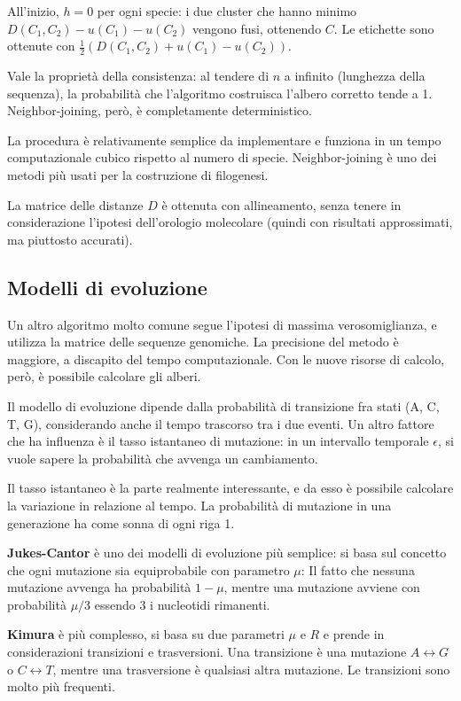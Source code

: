 All'inizio, $h = 0$ per ogni specie: i due cluster che hanno minimo $D(C_1, C_2) - u(C_1) - u(C_2)$ vengono fusi, ottenendo $C$. Le etichette sono ottenute con $\frac{1}{2}(D(C_1, C_2) + u(C_1) - u(C_2))$.

Vale la proprietà della consistenza: al tendere di $n$ a infinito (lunghezza della sequenza), la probabilità che l'algoritmo costruisca l'albero corretto tende a 1. Neighbor-joining, però, è completamente deterministico.

La procedura è relativamente semplice da implementare e funziona in un tempo computazionale cubico rispetto al numero di specie. Neighbor-joining è uno dei metodi più usati per la costruzione di filogenesi.

La matrice delle distanze $D$ è ottenuta con allineamento, senza tenere in considerazione l'ipotesi dell'orologio molecolare (quindi con risultati approssimati, ma piuttosto accurati).

\subsection{Modelli di evoluzione}
Un altro algoritmo molto comune segue l'ipotesi di massima verosomiglianza, e utilizza la matrice delle sequenze genomiche. La precisione del metodo è maggiore, a discapito del tempo computazionale. Con le nuove risorse di calcolo, però, è possibile calcolare gli alberi.

Il modello di evoluzione dipende dalla probabilità di transizione fra stati (A, C, T, G), considerando anche il tempo trascorso tra i due eventi. Un altro fattore che ha influenza è il tasso istantaneo di mutazione: in un intervallo temporale $\epsilon$, si vuole sapere la probabilità che avvenga un cambiamento. 

Il tasso istantaneo è la parte realmente interessante, e da esso è possibile calcolare la variazione in relazione al tempo. La probabilità di mutazione in una generazione ha come sonna di ogni riga 1.

\textbf{Jukes-Cantor} è uno dei modelli di evoluzione più semplice: si basa sul concetto che ogni mutazione sia equiprobabile con parametro $\mu$: Il fatto che nessuna mutazione avvenga ha probabilità $1 - \mu$, mentre una mutazione avviene con probabilità $\mu/3$ essendo 3 i nucleotidi rimanenti. 

\textbf{Kimura} è più complesso, si basa su due parametri $\mu$ e $R$ e prende in considerazioni transizioni e trasversioni. Una transizione è una mutazione $A \leftrightarrow G$ o $C \leftrightarrow T$, mentre una trasversione è qualsiasi altra mutazione. Le transizioni sono molto più frequenti.

